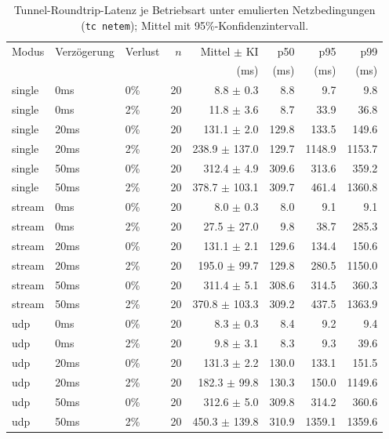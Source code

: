 \begin{table}[t]
  \centering
  \caption{Tunnel-Roundtrip-Latenz je Betriebsart unter emulierten Netzbedingungen (\texttt{tc netem}); Mittel mit 95\%-Konfidenzintervall.}
  \label{tab:latency}
  \begin{tabular}{lllrrrrr}
    \toprule
    Modus & Verzögerung & Verlust & $n$ & Mittel $\pm$ KI & p50 & p95 & p99 \\
     &  &  &  & (ms) & (ms) & (ms) & (ms) \\
    \midrule
    single & 0ms & 0\% & 20 & 8.8 $\pm$ 0.3 & 8.8 & 9.7 & 9.8 \\
    single & 0ms & 2\% & 20 & 11.8 $\pm$ 3.6 & 8.7 & 33.9 & 36.8 \\
    single & 20ms & 0\% & 20 & 131.1 $\pm$ 2.0 & 129.8 & 133.5 & 149.6 \\
    single & 20ms & 2\% & 20 & 238.9 $\pm$ 137.0 & 129.7 & 1148.9 & 1153.7 \\
    single & 50ms & 0\% & 20 & 312.4 $\pm$ 4.9 & 309.6 & 313.6 & 359.2 \\
    single & 50ms & 2\% & 20 & 378.7 $\pm$ 103.1 & 309.7 & 461.4 & 1360.8 \\
    stream & 0ms & 0\% & 20 & 8.0 $\pm$ 0.3 & 8.0 & 9.1 & 9.1 \\
    stream & 0ms & 2\% & 20 & 27.5 $\pm$ 27.0 & 9.8 & 38.7 & 285.3 \\
    stream & 20ms & 0\% & 20 & 131.1 $\pm$ 2.1 & 129.6 & 134.4 & 150.6 \\
    stream & 20ms & 2\% & 20 & 195.0 $\pm$ 99.7 & 129.8 & 280.5 & 1150.0 \\
    stream & 50ms & 0\% & 20 & 311.4 $\pm$ 5.1 & 308.6 & 314.5 & 360.3 \\
    stream & 50ms & 2\% & 20 & 370.8 $\pm$ 103.3 & 309.2 & 437.5 & 1363.9 \\
    udp & 0ms & 0\% & 20 & 8.3 $\pm$ 0.3 & 8.4 & 9.2 & 9.4 \\
    udp & 0ms & 2\% & 20 & 9.8 $\pm$ 3.1 & 8.3 & 9.3 & 39.6 \\
    udp & 20ms & 0\% & 20 & 131.3 $\pm$ 2.2 & 130.0 & 133.1 & 151.5 \\
    udp & 20ms & 2\% & 20 & 182.3 $\pm$ 99.8 & 130.3 & 150.0 & 1149.6 \\
    udp & 50ms & 0\% & 20 & 312.6 $\pm$ 5.0 & 309.8 & 314.2 & 360.6 \\
    udp & 50ms & 2\% & 20 & 450.3 $\pm$ 139.8 & 310.9 & 1359.1 & 1359.6 \\
    \bottomrule
  \end{tabular}
\end{table}
